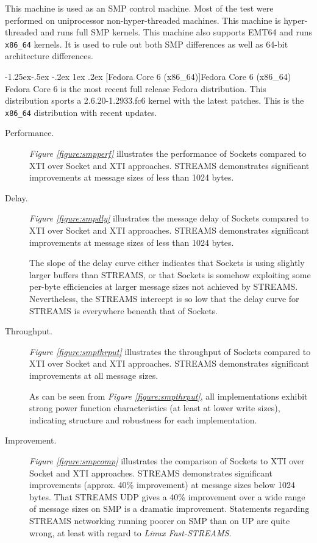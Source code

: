 \documentclass[letterpaper,final,notitlepage,twocolumn,10pt,twoside]{article}
\makeatletter
\renewcommand\subsubsection{\@startsection{subsubsection}{3}{\z@}%
                                     {-1.25ex\@plus -.5ex \@minus -.2ex}%
                                     {1ex \@plus .2ex}%
                                     {\normalfont\normalsize\bfseries}}
\makeatother
\begin{document}
This machine is used as an SMP control machine.  Most of the test were
performed on uniprocessor non-hyper-threaded machines.  This machine is
hyper-threaded and runs full SMP kernels.  This machine also supports EMT64 and
runs \texttt{x86\_64} kernels.  It is used to rule out both SMP differences as
well as 64-bit architecture differences.

\subsubsection[Fedora Core 6 (x86\_64)]{Fedora Core 6 (x86\_64)}
Fedora Core 6 is the most recent full release Fedora distribution.  This
distribution sports a 2.6.20-1.2933.fc6 kernel with the latest patches.  This is the
\texttt{x86\_64} distribution with recent updates.

\begin{description}

\item[Performance.]

\textit{Figure \ref{figure:smpperf}}
illustrates
the performance of Sockets compared to XTI over Socket and XTI approaches.
STREAMS demonstrates significant improvements at message sizes of less than
1024 bytes.

\item[Delay.]

\textit{Figure \ref{figure:smpdly}}
illustrates
the message delay of Sockets compared to XTI over Socket and XTI approaches.
STREAMS demonstrates significant improvements at message sizes of less than
1024 bytes.

The slope of the delay curve either indicates that Sockets is using slightly
larger buffers than STREAMS, or that Sockets is somehow exploiting some
per-byte efficiencies at larger message sizes not achieved by STREAMS.
Nevertheless, the STREAMS intercept is so low that the delay curve for STREAMS
is everywhere beneath that of Sockets.

\item[Throughput.]

\textit{Figure \ref{figure:smpthrput}}
illustrates the throughput of Sockets compared to XTI over Socket and XTI
approaches.  STREAMS demonstrates significant improvements at all message
sizes.

As can be seen from \textit{Figure \ref{figure:smpthrput}}, all
implementations exhibit strong power function characteristics (at least at
lower write sizes), indicating structure and robustness for each
implementation.

\item[Improvement.]

\textit{Figure \ref{figure:smpcomp}}
illustrates
the comparison of Sockets to XTI over Socket and XTI approaches.  STREAMS
demonstrates significant improvements (approx. 40\% improvement) at message
sizes below 1024 bytes.  That STREAMS UDP gives a 40\% improvement over a wide
range of message sizes on SMP is a dramatic improvement.  Statements regarding
STREAMS networking running poorer on SMP than on UP are quite wrong, at least
with regard to \textsl{Linux Fast-STREAMS}.

\end{description}
\end{document}
